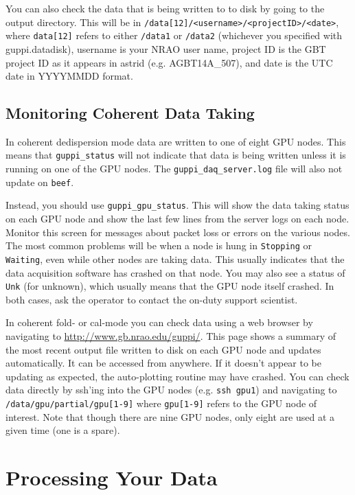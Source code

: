 You can also check the data that is being written to to disk by going to
the output directory.  This will be in
\texttt{/data[12]/<username>/<projectID>/<date>}, where
\texttt{data[12]} refers to either \texttt{/data1} or \texttt{/data2}
(whichever you specified with guppi.datadisk), username is your NRAO
user name, project ID is the GBT project ID as it appears in astrid
(e.g. AGBT14A\_507), and date is the UTC date in YYYYMMDD format.

\subsection{Monitoring Coherent Data Taking}
\label{sec:coddmonitor}

In coherent dedispersion mode data are written to one of eight GPU
nodes.  This means that \texttt{guppi\_status} will not indicate that
data is being written unless it is running on one of the GPU nodes.
The \texttt{guppi\_daq\_server.log} file will also not update on
\texttt{beef}.

Instead, you should use \texttt{guppi\_gpu\_status}.  This will show
the data taking status on each GPU node and show the last few lines
from the server logs on each node.  Monitor this screen for messages
about packet loss or errors on the various nodes.  The most common
problems will be when a node is hung in \texttt{Stopping} or
\texttt{Waiting}, even while other nodes are taking data.  This
usually indicates that the data acquisition software has crashed on
that node.  You may also see a status of \texttt{Unk} (for unknown),
which usually means that the GPU node itself crashed.  In both cases,
ask the operator to contact the on-duty support scientist.

In coherent fold- or cal-mode you can check data using a web browser
by navigating to \url{http://www.gb.nrao.edu/guppi/}.  This page shows
a summary of the most recent output file written to disk on each GPU
node and updates automatically.  It can be accessed from anywhere.  If
it doesn't appear to be updating as expected, the auto-plotting
routine may have crashed.  You can check data directly by ssh'ing into
the GPU nodes (e.g. \texttt{ssh gpu1}) and navigating to
\texttt{/data/gpu/partial/gpu[1-9]} where \texttt{gpu[1-9]} refers to
the GPU node of interest.  Note that though there are nine GPU nodes,
only eight are used at a given time (one is a spare).

\section{Processing Your Data}

